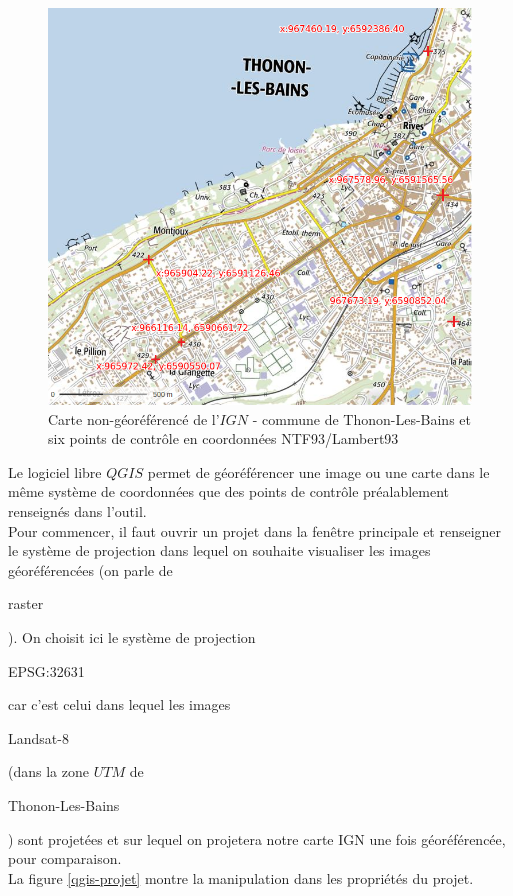 \documentclass{book}
\begin{document}
\begin{figure}[H]
\begin{center}
\includegraphics[scale=0.5]{images/georeferencing/ign-points-Thonon.png}
\end{center}
\caption{Carte non-géoréférencé de l'$IGN$ - commune de Thonon-Les-Bains et six points de contr\^{o}le en coordonnées NTF93/Lambert93}
\label{ign-points}
\end{figure}

Le logiciel libre $QGIS$ \cite{QGIS_software} permet de géoréférencer une image ou une carte dans le même système de coordonnées que des points de
contr\^{o}le préalablement renseignés dans l'outil.\\
Pour commencer, il faut ouvrir un projet dans la fen\^{e}tre principale et renseigner le système de projection dans lequel on souhaite visualiser
les images géoréférencées (on parle de \begin{itshape}raster\end{itshape}). On choisit ici le système de projection
\begin{itshape}EPSG:32631\end{itshape} car c'est celui dans lequel les images \begin{itshape}Landsat-8\end{itshape} (dans la zone $UTM$ 
de \begin{itshape}Thonon-Les-Bains\end{itshape}) sont projetées et
sur lequel on projetera notre carte IGN une fois géoréférencée, pour comparaison.\\
La figure \ref{qgis-projet} montre la manipulation dans les propriétés du projet.
\end{document}
